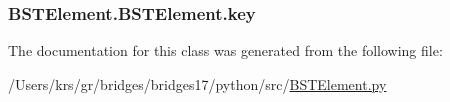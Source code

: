 \subsubsection[{key}]{\setlength{\rightskip}{0pt plus 5cm}B\+S\+T\+Element.\+B\+S\+T\+Element.\+key}\label{class_b_s_t_element_1_1_b_s_t_element_a735558f94dd610c6f8ce54ecd3446ed1}


The documentation for this class was generated from the following file\+:\begin{DoxyCompactItemize}
\item 
/\+Users/krs/gr/bridges/bridges17/python/src/\hyperlink{_b_s_t_element_8py}{B\+S\+T\+Element.\+py}\end{DoxyCompactItemize}
